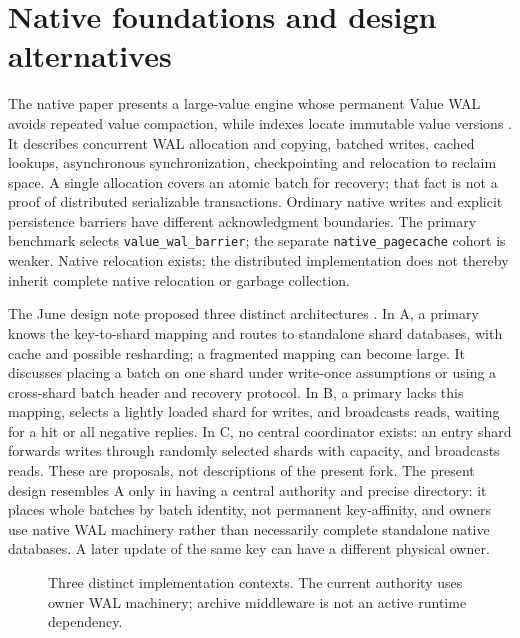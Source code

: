 \documentclass[11pt,a4paper]{article}
\begin{document}
\section{Native foundations and design alternatives}\label{sec:foundations}
The native paper presents a large-value engine whose permanent Value WAL avoids repeated value compaction, while indexes locate immutable value versions \cite{tidehunter2026}. It describes concurrent WAL allocation and copying, batched writes, cached lookups, asynchronous synchronization, checkpointing and relocation to reclaim space. A single allocation covers an atomic batch for recovery; that fact is not a proof of distributed serializable transactions. Ordinary native writes and explicit persistence barriers have different acknowledgment boundaries. The primary benchmark selects \texttt{value\_wal\_barrier}; the separate \texttt{native\_pagecache} cohort is weaker. Native relocation exists; the distributed implementation does not thereby inherit complete native relocation or garbage collection.

The June design note proposed three distinct architectures \cite{distributednote2026}. In A, a primary knows the key-to-shard mapping and routes to standalone shard databases, with cache and possible resharding; a fragmented mapping can become large. It discusses placing a batch on one shard under write-once assumptions or using a cross-shard batch header and recovery protocol. In B, a primary lacks this mapping, selects a lightly loaded shard for writes, and broadcasts reads, waiting for a hit or all negative replies. In C, no central coordinator exists: an entry shard forwards writes through randomly selected shards with capacity, and broadcasts reads. These are proposals, not descriptions of the present fork. The present design resembles A only in having a central authority and precise directory: it places whole batches by batch identity, not permanent key-affinity, and owners use native WAL machinery rather than necessarily complete standalone native databases. A later update of the same key can have a different physical owner.

\begin{figure}[htbp]\centering
{}
\caption{Three distinct implementation contexts. The current authority uses owner WAL machinery; archive middleware is not an active runtime dependency.}\label{fig:contexts}
\end{figure}
\end{document}
